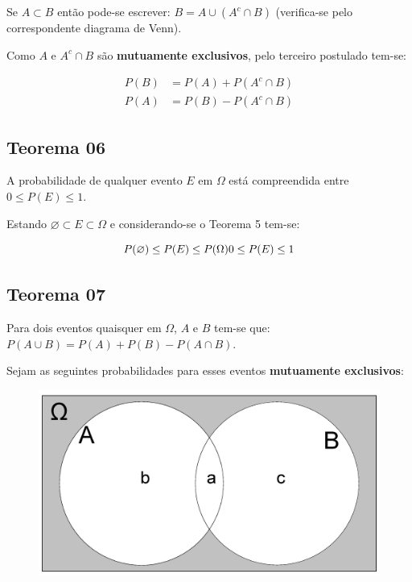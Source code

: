 \documentclass[
]{book}
\begin{document}
Se \(A \subset B\) então pode-se escrever: \(B = A \cup (A^{c} \cap B)\) (verifica-se pelo correspondente diagrama de Venn).

Como \(A\) e \(A^{c}\cap B\) são \textbf{mutuamente exclusivos}, pelo terceiro postulado tem-se:

\hfill\break

\begin{align*}
P(B) &  = P(A) + P(A^{c}\cap B) \\
P(A) & = P(B) - P(A^{c}\cap B)
\end{align*}

\hfill\break

\hypertarget{teorema-06}{%
\subsection{Teorema 06}\label{teorema-06}}

\hfill\break

A probabilidade de qualquer evento \(E\) em \(\Omega\) está compreendida entre \(0 \leq P(E) \leq 1\).

\hfill\break

Estando \(\varnothing \subset E \subset \Omega\) e considerando-se o Teorema 5 tem-se:

\hfill\break

\[
P(\varnothing)  \leq P(E) \leq P(\Omega) \\
0 \leq P(E) \leq 1
\]

\hfill\break

\hypertarget{teorema-07}{%
\subsection{Teorema 07}\label{teorema-07}}

\hfill\break

Para dois eventos quaisquer em \(\Omega\), \(A\) e \(B\) tem-se que: \(P( A \cup B ) = P(A) + P(B) - P(A \cap B)\).

\hfill\break

Sejam as seguintes probabilidades para esses eventos \textbf{mutuamente exclusivos}:

\hfill\break

\begin{figure}

{\centering \includegraphics[width=0.5\linewidth]{images4/venn_TEO_7} 

}

\end{figure}
\end{document}

